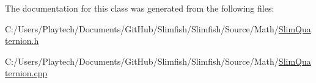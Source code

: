 The documentation for this class was generated from the following files\+:\begin{DoxyCompactItemize}
\item 
C\+:/\+Users/\+Playtech/\+Documents/\+Git\+Hub/\+Slimfish/\+Slimfish/\+Source/\+Math/\hyperlink{_slim_quaternion_8h}{Slim\+Quaternion.\+h}\item 
C\+:/\+Users/\+Playtech/\+Documents/\+Git\+Hub/\+Slimfish/\+Slimfish/\+Source/\+Math/\hyperlink{_slim_quaternion_8cpp}{Slim\+Quaternion.\+cpp}\end{DoxyCompactItemize}
